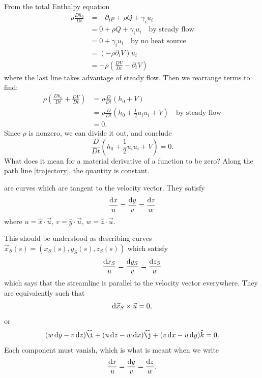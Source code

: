 \begin{node}
From the total Enthalpy equation
\begin{subequations}
  \begin{align}
\rho\frac{Dh_{0}}{Dt}
&=-\partial_{t}p+\rho Q+\gamma_{i}u_{i}\\
&=0+\rho Q +\gamma_{i}u_{i}\quad\mbox{by steady flow}\\
&=0+\gamma_{i}u_{i}\quad\mbox{by no heat source}\\
&=(-\rho\partial_{i}V)u_{i}\\
&=-\rho\left(\frac{DV}{Dt}-\partial_{t}V\right)
  \end{align}
\end{subequations}
where the last line takes advantage of steady flow. Then we rearrange
terms to find:
\begin{subequations}
  \begin{align}
\rho\left(\frac{Dh_{0}}{Dt}+\frac{DV}{Dt}\right)
&=\rho\frac{D}{Dt}(h_{0}+V)\\
&=\rho\frac{D}{Dt}(h_{0}+\frac{1}{2}u_{i}u_{i}+V)\quad\mbox{by steady flow}\\
&=0.
  \end{align}
\end{subequations}
Since $\rho$ is nonzero, we can divide it out, and conclude
\begin{equation}
\frac{D}{Dt}(h_{0}+\frac{1}{2}u_{i}u_{i}+V)=0.
\end{equation}
What does it mean for a material derivative of a function to be zero?
Along the path line [trajectory], the quantity is constant.
\end{node}

\begin{definition}\label{defn:stream-line}
 are curves which are tangent to the velocity vector.
They satisfy
\begin{equation*}
\frac{\mathrm{d} x}{u}=\frac{\mathrm{d} y}{v}=\frac{\mathrm{d} z}{w}
\end{equation*}
where $u=\widehat{x}\cdot\vec{u}$, $v=\widehat{y}\cdot\vec{u}$, $w=\widehat{z}\cdot\vec{u}$.

This should be understood as describing curves $\vec{x}_{S}(s)=(x_{S}(s),y_{S}(s),z_{S}(s))$
which satisfy 
\begin{equation*}
\frac{\mathrm{d} x_{S}}{u}=\frac{\mathrm{d} y_{S}}{v}=\frac{\mathrm{d} z_{S}}{w}
\end{equation*}
which says that the streamline is parallel to the velocity vector
everywhere. They are equivalently such that
\begin{equation*}
\mathrm{d}\vec{x}_{S}\times\vec{u}=0,
\end{equation*}
or
\begin{equation*}
(w\,\D y-v\,\D z)\widehat{\i}+(u\,\D z-w\,\D x)\widehat{\j}+(v\,\D x-u\,\D y)\widehat{k}=0.
\end{equation*}
Each component must vanish, which is what is meant when we write
\begin{equation*}
\frac{\mathrm{d} x}{u}=\frac{\mathrm{d} y}{v}=\frac{\mathrm{d} z}{w}.
\end{equation*}
\end{definition}

